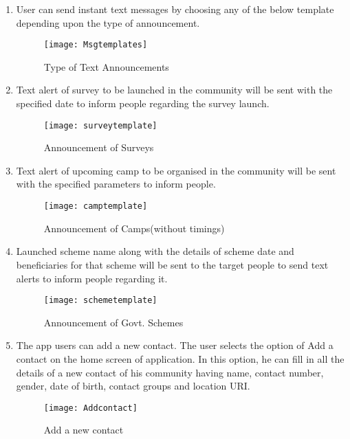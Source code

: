 \begin {enumerate}
\item User can send instant text messages by choosing any of the below template depending upon the type of announcement.
\begin{figure}[H]
\begin{center}   
\texttt{[image: Msgtemplates]}
\caption{Type of Text Announcements}
\label{fig:message}
\end{center}
\end{figure}

\item Text alert of survey to be launched in the community will be sent with the specified date to inform people regarding the survey launch.
\begin{figure}[H]
\begin{center}   
\texttt{[image: surveytemplate]}
\caption{Announcement of Surveys}
\label{fig:message1}
\end{center}
\end{figure}

\item Text alert of upcoming camp to be organised in the community will be sent with the specified parameters to inform people. 
\begin{figure}[H]
\begin{center}   
\texttt{[image: camptemplate]}
\caption{Announcement of Camps(without timings)}
\label{fig:message2}
\end{center}
\end{figure}


\item  Launched scheme name along with the details of scheme date and beneficiaries for that scheme will be sent to the target people to send text alerts to inform people regarding it.
\begin{figure}[H]
\begin{center}   
\texttt{[image: schemetemplate]}
\caption{Announcement of Govt. Schemes}
\label{fig:message3}
\end{center}
\end{figure}

\item The app users can add a new contact. The user selects the option of Add a contact on the  home screen of application. In this option, he can fill in all the details of a new contact of his community having name, contact number, gender, date of birth, contact groups and location URI.
\begin{figure}[H]
\begin{center}   
\texttt{[image: Addcontact]}
\caption{Add a new contact}
\label{fig:contact1}
\end{center}
\end{figure}


\end{enumerate}
